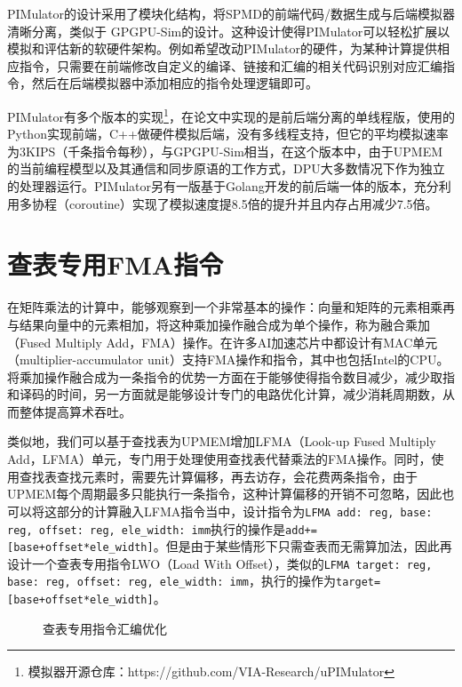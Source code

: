 PIMulator的设计采用了模块化结构，将SPMD的前端代码/数据生成与后端模拟器清晰分离，类似于 GPGPU-Sim的设计。这种设计使得PIMulator可以轻松扩展以模拟和评估新的软硬件架构。例如希望改动PIMulator的硬件，为某种计算提供相应指令，只需要在前端修改自定义的编译、链接和汇编的相关代码识别对应汇编指令，然后在后端模拟器中添加相应的指令处理逻辑即可。

PIMulator有多个版本的实现\footnote{模拟器开源仓库：https://github.com/VIA-Research/uPIMulator}，在论文中实现的是前后端分离的单线程版，使用的Python实现前端，C++做硬件模拟后端，没有多线程支持，但它的平均模拟速率为3KIPS（千条指令每秒），与GPGPU-Sim相当，在这个版本中，由于UPMEM的当前编程模型以及其通信和同步原语的工作方式，DPU大多数情况下作为独立的处理器运行。PIMulator另有一版基于Golang开发的前后端一体的版本，充分利用多协程（coroutine）实现了模拟速度提8.5倍的提升并且内存占用减少7.5倍。

\section{查表专用FMA指令}
在矩阵乘法的计算中，能够观察到一个非常基本的操作：向量和矩阵的元素相乘再与结果向量中的元素相加，将这种乘加操作融合成为单个操作，称为融合乘加（Fused Multiply Add，FMA）操作。在许多AI加速芯片中都设计有MAC单元（multiplier-accumulator unit）支持FMA操作和指令，其中也包括Intel的CPU。将乘加操作融合成为一条指令的优势一方面在于能够使得指令数目减少，减少取指和译码的时间，另一方面就是能够设计专门的电路优化计算，减少消耗周期数，从而整体提高算术吞吐。

类似地，我们可以基于查找表为UPMEM增加LFMA（Look-up Fused Multiply Add，LFMA）单元，专门用于处理使用查找表代替乘法的FMA操作。同时，使用查找表查找元素时，需要先计算偏移，再去访存，会花费两条指令，由于UPMEM每个周期最多只能执行一条指令，这种计算偏移的开销不可忽略，因此也可以将这部分的计算融入LFMA指令当中，设计指令为\verb|LFMA add: reg, base: reg, offset: reg, ele_width: imm|执行的操作是\verb|add+=[base+offset*ele_width]|。但是由于某些情形下只需查表而无需算加法，因此再设计一个查表专用指令LWO（Load With Offset），类似的\verb|LFMA target: reg, base: reg, offset: reg, ele_width: imm|，执行的操作为\verb|target=[base+offset*ele_width]|。

\begin{figure}[htbp!]
	\centering
	\label{ASM}
	\caption{查表专用指令汇编优化}
\end{figure}

